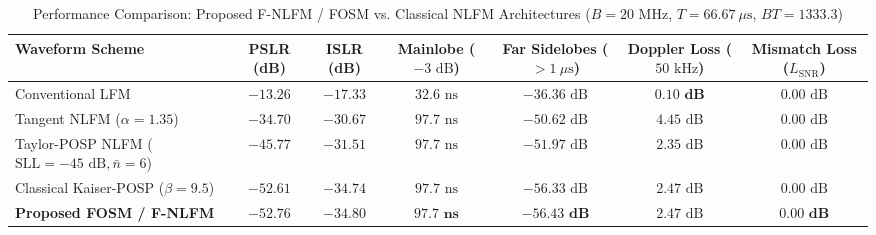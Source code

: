 \documentclass[journal,compsoc]{IEEEtran}
\begin{document}
\begin{table}[t]
\centering
\caption{Performance Comparison: Proposed F-NLFM / FOSM vs. Classical NLFM Architectures ($B = 20\text{ MHz}$, $T = 66.67\ \mu\text{s}$, $BT = 1333.3$)}
\label{tab:theoretical_comparison}
\begin{tabular}{lcccccc}
\toprule
\textbf{Waveform Scheme} & \textbf{PSLR (dB)} & \textbf{ISLR (dB)} & \textbf{Mainlobe ($-3\text{ dB}$)} & \textbf{Far Sidelobes ($>1\ \mu\text{s}$)} & \textbf{Doppler Loss ($50\text{ kHz}$)} & \textbf{Mismatch Loss ($L_{\text{SNR}}$)} \\
\midrule
Conventional LFM & $\mathbf{-13.26}$ & $-17.33$ & $32.6\text{ ns}$ & $-36.36\text{ dB}$ & $\mathbf{0.10\text{ dB}}$ & $0.00\text{ dB}$ \\
Tangent NLFM ($\alpha = 1.35$) & $-34.70$ & $-30.67$ & $97.7\text{ ns}$ & $-50.62\text{ dB}$ & $4.45\text{ dB}$ & $0.00\text{ dB}$ \\
Taylor-POSP NLFM ($\text{SLL}=-45\text{ dB}, \bar{n}=6$) & $-45.77$ & $-31.51$ & $97.7\text{ ns}$ & $-51.97\text{ dB}$ & $2.35\text{ dB}$ & $0.00\text{ dB}$ \\
Classical Kaiser-POSP ($\beta = 9.5$) & $-52.61$ & $-34.74$ & $97.7\text{ ns}$ & $-56.33\text{ dB}$ & $2.47\text{ dB}$ & $0.00\text{ dB}$ \\
\textbf{Proposed FOSM / F-NLFM} & $\mathbf{-52.76}$ & $\mathbf{-34.80}$ & $\mathbf{97.7\text{ ns}}$ & $\mathbf{-56.43\text{ dB}}$ & $2.47\text{ dB}$ & $\mathbf{0.00\text{ dB}}$ \\
\bottomrule
\end{tabular}
\end{table}
\end{document}
